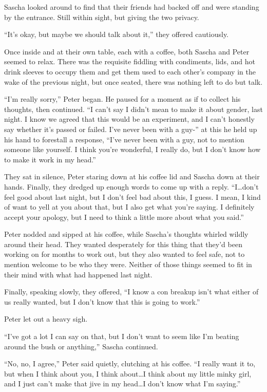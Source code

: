 Sascha looked around to find that their friends had backed off and were standing by the entrance. Still within sight, but giving the two privacy.

``It's okay, but maybe we should talk about it,'' they offered cautiously.

Once inside and at their own table, each with a coffee, both Sascha and Peter seemed to relax. There was the requisite fiddling with condiments, lids, and hot drink sleeves to occupy them and get them used to each other's company in the wake of the previous night, but once seated, there was nothing left to do but talk.

``I'm really sorry,'' Peter began. He paused for a moment as if to collect his thoughts, then continued. ``I can't say I didn't mean to make it about gender, last night. I know we agreed that this would be an experiment, and I can't honestly say whether it's passed or failed. I've never been with a guy-'' at this he held up his hand to forestall a response, ``I've never been with a guy, not to mention someone like yourself. I think you're wonderful, I really do, but I don't know how to make it work in my head.''

They sat in silence, Peter staring down at his coffee lid and Sascha down at their hands. Finally, they dredged up enough words to come up with a reply. ``I\ldots{}don't feel good about last night, but I don't feel bad about this, I guess. I mean, I kind of want to yell at you about that, but I also get what you're saying. I definitely accept your apology, but I need to think a little more about what you said.''

Peter nodded and sipped at his coffee, while Sascha's thoughts whirled wildly around their head. They wanted desperately for this thing that they'd been working on for months to work out, but they also wanted to feel safe, not to mention welcome to be who they were. Neither of those things seemed to fit in their mind with what had happened last night.

Finally, speaking slowly, they offered, ``I know a con breakup isn't what either of us really wanted, but I don't know that this is going to work.''

Peter let out a heavy sigh.

``I've got a lot I can say on that, but I don't want to seem like I'm beating around the bush or anything,'' Sascha continued.

``No, no, I agree,'' Peter said quietly, clutching at his coffee. ``I really want it to, but when I think about you, I think about\ldots{}I think about my little minky girl, and I just can't make that jive in my head\ldots{}I don't know what I'm saying.''

